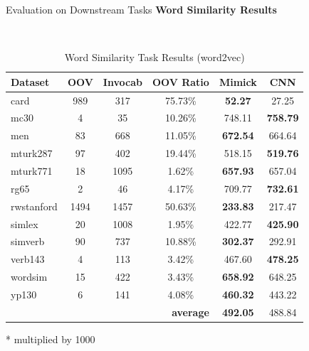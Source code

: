 \documentclass{beamer}
\begin{document}
\begin{frame}{Evaluation on Downstream Tasks}
    \textbf{Word Similarity Results}
    \begin{table}[!ht]
        \footnotesize
        \begin{center}
        \begin{threeparttable} 
          \caption{Word Similarity Task Results (word2vec)}
          ~\\
          \label{tab:wordsim:word2vec}
          \begin{tabular}{l|c|c|c|c|c}
            \textbf{Dataset} & \textbf{OOV} & \textbf{Invocab} & \textbf{OOV Ratio} & \textbf{Mimick}\tnote{*} & \textbf{CNN}\tnote{*}\\
            \hline
            card & 989 & 317 & 75.73\% & \textbf{52.27} & 27.25\\
            mc30 & 4 & 35 & 10.26\% & 748.11 & \textbf{758.79}\\
            men & 83 & 668 & 11.05\% & \textbf{672.54} & 664.64\\
            mturk287 & 97 & 402 & 19.44\% & 518.15 & \textbf{519.76}\\
            mturk771 & 18 & 1095 & 1.62\% & \textbf{657.93} & 657.04\\
            rg65 & 2 & 46 & 4.17\% & 709.77 & \textbf{732.61}\\
            rwstanford & 1494 & 1457 & 50.63\% & \textbf{233.83} & 217.47\\
            simlex & 20 & 1008 & 1.95\% & 422.77 & \textbf{425.90}\\
            simverb & 90 & 737 & 10.88\% & \textbf{302.37} & 292.91\\
            verb143 & 4 & 113 & 3.42\% & 467.60 & \textbf{478.25}\\
            wordsim & 15 & 422 & 3.43\% & \textbf{658.92} & 648.25\\
            yp130 & 6 & 141 & 4.08\% & \textbf{460.32} & 443.22\\
            \hline
            \multicolumn{4}{r|}{\textbf{average}} & \textbf{492.05} & 488.84\\
          \end{tabular}
          \begin{tablenotes}
            \item[*] multiplied by 1000
          \end{tablenotes}
        
        \end{threeparttable} 
        \end{center}
        \end{table}
\end{frame}
\end{document}
